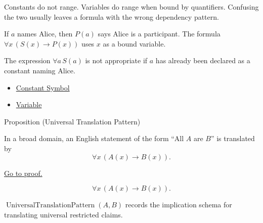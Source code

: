 \begin{remark*}[Interpretation]
Constants do not range. Variables do range when bound by quantifiers. Confusing
the two usually leaves a formula with the wrong dependency pattern.
\end{remark*}

\begin{remark*}[Examples]
If \(a\) names Alice, then \(P(a)\) says Alice is a participant. The formula
\(\forall x\,(S(x)\to P(x))\) uses \(x\) as a bound variable.
\end{remark*}

\begin{remark*}
The expression \(\forall a\,S(a)\) is not appropriate if \(a\) has already been
declared as a constant naming Alice.
\end{remark*}

\begin{dependencies}
\begin{itemize}
  \item \hyperref[def:constant-symbol]{Constant Symbol}
  \item \hyperref[def:variable]{Variable}
\end{itemize}
\end{dependencies}

\begin{propositionbox}{Proposition (Universal Translation Pattern)}
\begin{proposition}
\label{prop:universal-translation-pattern}
In a broad domain, an English statement of the form ``All \(A\) are \(B\)''
is translated by
\[
\forall x\,(A(x)\to B(x)).
\]

\noindent\hyperref[prf:universal-translation-pattern]{Go to proof.}
\end{proposition}
\end{propositionbox}

\begin{remark*}
\[
\forall x\,(A(x)\to B(x)).
\]
\end{remark*}

\begin{remark*}
\(\operatorname{UniversalTranslationPattern}(A,B)\) records the implication
schema for translating universal restricted claims.
\end{remark*}

